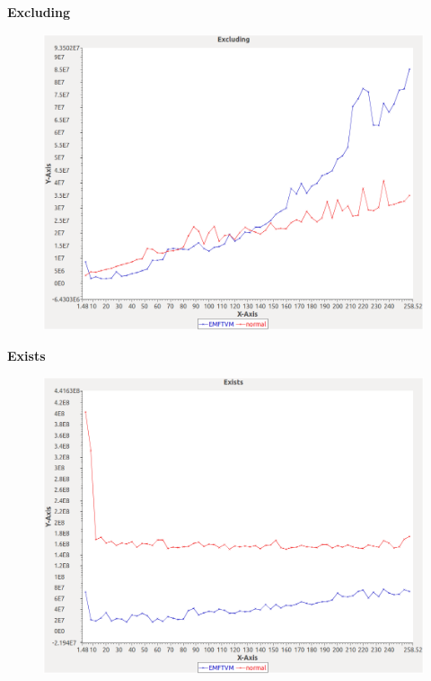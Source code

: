 \noindent\textbf{Excluding}

\begin{figure}[h]
\centering
\includegraphics[width=\textwidth]{graphs/orderedset/Excluding}
\end{figure}
\pagebreak

\noindent\textbf{Exists}

\begin{figure}[h]
\centering
\includegraphics[width=\textwidth]{graphs/orderedset/Exists}
\end{figure}
\pagebreak

